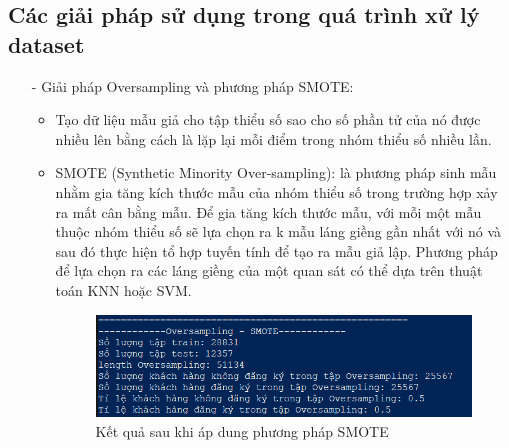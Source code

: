 \documentclass{report}
\newcommand\tab[1][1.25cm]{\hspace*{#1}}
\begin{document}
        \subsection{Các giải pháp sử dụng trong quá trình xử lý dataset}   
            \begin{enumerate}
                \item [- ] Giải pháp Oversampling và phương pháp SMOTE:
                    \begin{itemize}
                        \item Tạo dữ liệu mẫu giả cho tập thiểu số sao cho số phần tử của nó được nhiều lên bằng cách là lặp lại mỗi điểm trong nhóm thiểu số nhiều lần.
                        \item SMOTE (Synthetic Minority Over-sampling): là phương pháp sinh mẫu nhằm gia tăng kích thước mẫu của nhóm thiểu số trong trường hợp xảy ra mất cân bằng mẫu. Để gia tăng kích thước mẫu, với mỗi một mẫu thuộc nhóm thiểu số sẽ lựa chọn ra k mẫu láng giềng gần nhất với nó và sau đó thực hiện tổ hợp tuyến tính để tạo ra mẫu giả lập. Phương pháp để lựa chọn ra các láng giềng của một quan sát có thể dựa trên thuật toán KNN hoặc SVM.
                        \begin{figure}[htp]
                            \centering
                            \tab[1.25cm]\includegraphics[scale = 1.1]{image/VC_4.png}
                            \caption{Kết quả sau khi áp dung phương pháp SMOTE}
                        \end{figure}
                    \end{itemize}
            
        \pagebreak
                        

\end{enumerate}
\end{document}
